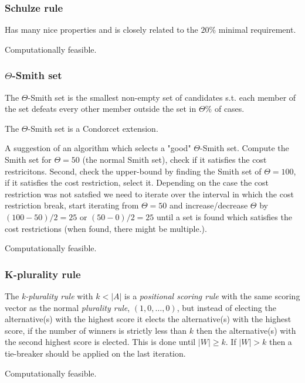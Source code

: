 \documentclass{article}
\begin{document}
\subsubsection{Schulze rule}

Has many nice properties and is closely related to the $20\%$ minimal requirement.

Computationally feasible.

\subsubsection{$\Theta$-Smith set}

The $\Theta$-Smith set is the smallest non-empty set of candidates s.t. each member of the set defeats every other member outside
 the set in $\Theta \%$ of cases.

 The $\Theta$-Smith set is a Condorcet extension.

A suggestion of an algorithm which selects a "good" $\Theta$-Smith set. Compute the Smith set for $\Theta=50$
(the normal Smith set), check if it satisfies the cost restricitons. Second, check the upper-bound by finding the Smith
set of $\Theta=100$, if it satisfies the cost restriction, select it. Depending on the case the cost restriction was not
satsfied we need to iterate over the interval in which the cost restriction break, start iterating from $\Theta=50$ and
 increase/decrease $\Theta$ by $(100-50)/2=25$ or $(50-0)/2=25$ until a set is found which satisfies the cost
 restrictions (when found, there might be multiple.).

Computationally feasible.

\subsubsection{K-plurality rule}

The {\em k-plurality rule} with $k<|A|$ is a {\em positional scoring rule} with the same scoring vector as the normal
{\em plurality rule}, $(1,0, \dots, 0)$, but instead of electing the alternative(s) with the highest score it elects the
alternative(s) with the highest score, if the number of winners is strictly less than $k$ then the alternative(s) with
the second highest score is elected. This is done until $|W| \geq k$. If $|W| > k$ then a tie-breaker should be applied
on the last iteration.

Computationally feasible.
\end{document}

